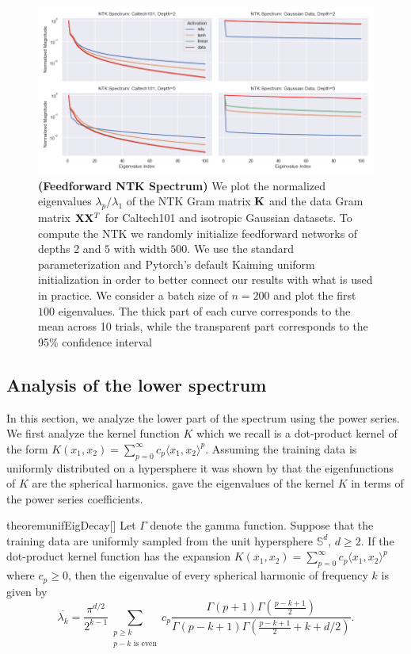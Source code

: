 \begin{figure}[H]
    \centering
    \includegraphics[width=\textwidth]{conference_files/images/fnn_spectrums2.png}
    \caption{\textbf{ (Feedforward NTK Spectrum) } We plot the normalized eigenvalues $\lambda_p / \lambda_1$ of the NTK Gram matrix $\mathbf{K}$ and the data Gram matrix $\mathbf{X} \mathbf{X}^T$ for Caltech101 and isotropic Gaussian datasets. To compute the NTK we randomly initialize feedforward networks of depths $2$ and $5$ with width $500$. We use the standard parameterization and Pytorch's default Kaiming uniform initialization in order to better connect our results with what is used in practice. We consider a batch size of $n = 200$ and plot the first $100$ eigenvalues. The thick part of each curve corresponds to the mean across 10 trials, while the transparent part corresponds to the 95\% confidence interval}
    \label{fig:spectrum_cifar}
\end{figure}


\subsection{Analysis of the lower spectrum}\label{subsec:lower}
In this section, we analyze the lower part of the spectrum using the power series. 
We first analyze the kernel function $K$ which we recall is a dot-product kernel of the form $K(x_1,x_2) = \sum_{p = 0}^{\infty} c_p \langle x_1,x_2\rangle^p$. 
Assuming the training data is uniformly distributed on a hypersphere it was shown by \cite{uniform_sphere_data, bietti2019inductive} that the eigenfunctions of $K$ are the spherical harmonics. \cite{azevedo2015eigenvalues} gave the eigenvalues of the kernel $K$ in terms of the power series coefficients.
\begin{restatable}{theorem}{unifEigDecay}[\cite{azevedo2015eigenvalues}]\label{thm:eigen_hypersphere}  Let $\Gamma$ denote the gamma function.  Suppose that the training data are uniformly sampled from the unit hypersphere $\mathbb{S}^d$, $d\geq 2$.
If the dot-product kernel function has the expansion $K(x_1,x_2) = \sum_{p = 0}^{\infty} c_p \langle x_1,x_2\rangle^p$ where $c_p\geq 0$, then the eigenvalue of every spherical harmonic of frequency $k$ is given by 
\begin{equation*}
    \overline{\lambda_k}=\frac{\pi^{d/2}}{2^{k-1}}\sum_{\substack{p\geq k\\p-k\text{ is even}}}c_p\frac{ \Gamma(p+1)\Gamma(\frac{p-k+1}{2})}{\Gamma(p-k+1)\Gamma(\frac{p-k+1}{2}+k+d/2)}.
\end{equation*}
\end{restatable} 

